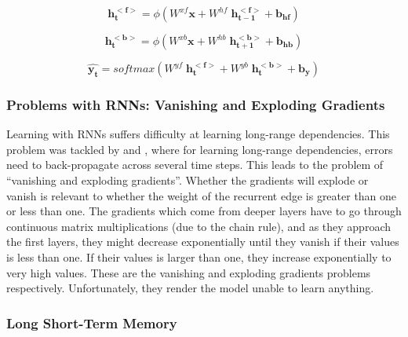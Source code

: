 \begin{equation}
\label{eq:4}
\mathbf{h_t^{<f>}} = \phi(W^{xf} \mathbf{x} + W^{hf} \; \mathbf{h_{t-1}^{<f>}} + \mathbf{b_{hf}})
\end{equation}

\begin{equation}
\label{eq:5}
\mathbf{h_t^{<b>}} = \phi(W^{xb} \mathbf{x} + W^{hb} \; \mathbf{h_{t+1}^{<b>}} + \mathbf{b_{hb}})
\end{equation}

\begin{equation}
\label{eq:6}
\mathbf{\widehat{y_t}} = softmax(W^{yf} \; \mathbf{h_t^{<f>}} + W^{yb} \; \mathbf{h_t^{<b>}} + \mathbf{b_y})
\end{equation}



\subsubsection{Problems with \ac{RNN}s: Vanishing and Exploding Gradients}
\label{bg:s2_sub2_subsub2}

Learning with \ac{RNN}s suffers difficulty at learning long-range dependencies. This problem was tackled by \cite{bengio1994learning} and \cite{hochreiter2001gradient}, where for learning long-range dependencies, errors need to back-propagate across several time steps. This leads to the problem of \enquote{vanishing and exploding gradients}. Whether the gradients will explode or vanish is relevant to whether the weight of the recurrent edge is greater than one or less than one. The gradients which come from deeper layers have to go through continuous matrix multiplications (due to the chain rule), and as they approach the first layers, they might decrease exponentially until they vanish if their values is less than one. If their values is larger than one, they increase exponentially to very high values. These are the vanishing and exploding gradients problems respectively. Unfortunately, they render the model unable to learn anything.


\subsubsection{Long Short-Term Memory}
\label{bg:s2_sub2_subsub3}

